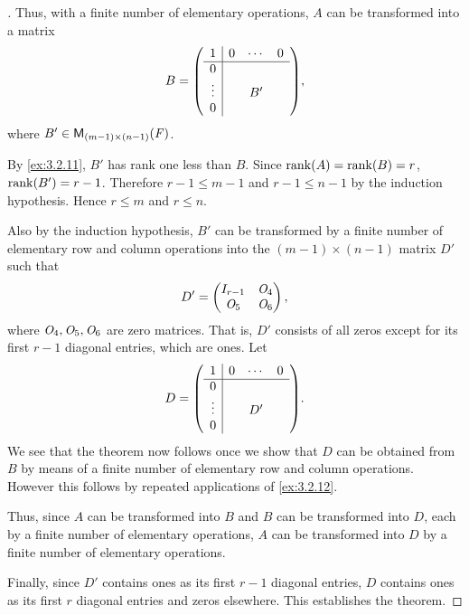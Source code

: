 \begin{proof}[]
  Thus, with a finite number of elementary operations, \(A\) can be transformed into a matrix
  \[
    B = \pa{\begin{array}{c|ccc}
        1      & 0 & \cdots & 0 \\
        \hline
        0      &   &        &   \\
        \vdots &   & B'     &   \\
        0      &   &        &
      \end{array}},
  \]
  where \(B' \in \mathsf{M}_{{(m - 1)} \times (n - 1)}({\mathit{F}})\).

  By \cref{ex:3.2.11}, \(B'\) has rank one less than \(B\).
  Since \(\rk{A} = \rk{B} = r\), \(\rk{B'} = r - 1\).
  Therefore \(r - 1 \leq m - 1\) and \(r - 1 \leq n - 1\) by the induction hypothesis.
  Hence \(r \leq m\) and \(r \leq n\).

  Also by the induction hypothesis, \(B'\) can be transformed by a finite number of elementary row and column operations into the \((m-1) \times (n-1)\) matrix \(D'\) such that
  \[
    D' = \begin{pmatrix}
      I_{r - 1} & \mathit{O}_4 \\
      \mathit{O}_5     & \mathit{O}_6
    \end{pmatrix},
  \]
  where \(\mathit{O}_4, \mathit{O}_5, \mathit{O}_6\) are zero matrices.
  That is, \(D'\) consists of all zeros except for its first \(r - 1\) diagonal entries, which are ones.
  Let
  \[
    D = \pa{\begin{array}{c|ccc}
        1      & 0 & \cdots & 0 \\
        \hline
        0      &   &        &   \\
        \vdots &   & D'     &   \\
        0      &   &        &
      \end{array}}.
  \]
  We see that the theorem now follows once we show that \(D\) can be obtained from \(B\) by means of a finite number of elementary row and column operations.
  However this follows by repeated applications of \cref{ex:3.2.12}.

  Thus, since \(A\) can be transformed into \(B\) and \(B\) can be transformed into \(D\), each by a finite number of elementary operations, \(A\) can be transformed into \(D\) by a finite number of elementary operations.

  Finally, since \(D'\) contains ones as its first \(r - 1\) diagonal entries, \(D\) contains ones as its first \(r\) diagonal entries and zeros elsewhere.
  This establishes the theorem.
\end{proof}

